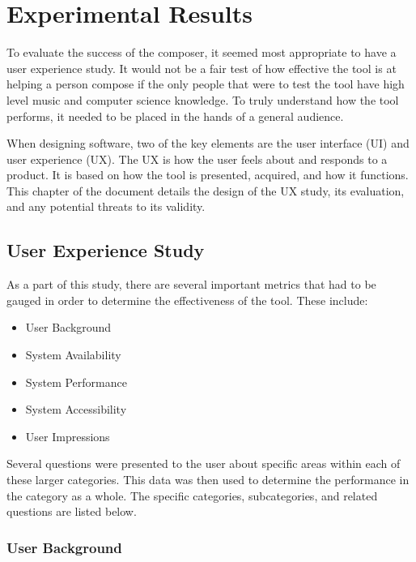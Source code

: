 \chapter{Experimental Results} 
\label{ch:experimentalresults}

To evaluate the success of the composer, it seemed most appropriate to have a user experience study.  It would not be a fair test of how effective the tool is at helping a person compose if the only people that were to test the tool have high level music and computer science knowledge.  To truly understand how the tool performs, it needed to be placed in the hands of a general audience.

\vspace{\baselineskip}

When designing software, two of the key elements are the user interface (UI) and user experience (UX).  The UX is how the user feels about and responds to a product.  It is based on how the tool is presented, acquired, and how it functions.  This chapter of the document details the design of the UX study, its evaluation, and any potential threats to its validity.

\section{User Experience Study}
\label{sec:userexperiencestudy}

As a part of this study, there are several important metrics that had to be gauged in order to determine the effectiveness of the tool.  These include:

\begin{itemize}
	\item User Background
	\item System Availability
	\item System Performance
	\item System Accessibility
	\item User Impressions
\end{itemize}

Several questions were presented to the user about specific areas within each of these larger categories.  This data was then used to determine the performance in the category as a whole.  The specific categories, subcategories, and related questions are listed below.

\subsection{User Background}
\label{subsec:userbackground}

